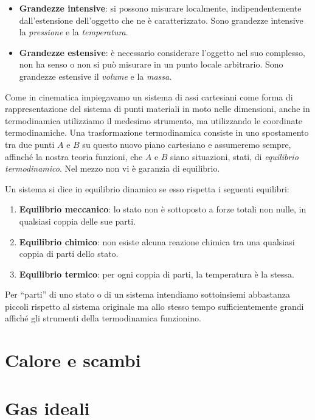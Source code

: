 \begin{itemize}
    \item \textbf{Grandezze intensive}: si possono misurare localmente,
    indipendentemente dall'estensione dell'oggetto che ne è caratterizzato.
    Sono grandezze intensive la \textit{pressione} e la \textit{temperatura}.

    \item \textbf{Grandezze estensive}: è necessario considerare l'oggetto nel
    suo complesso, non ha senso o non si può misurare in un punto locale arbitrario.
    Sono grandezze estensive il \textit{volume} e la \textit{massa}.
\end{itemize}

\noindent Come in cinematica impiegavamo un sistema di assi cartesiani come
forma di rappresentazione del sistema di punti materiali in moto nelle dimensioni,
anche in termodinamica utilizziamo il medesimo strumento, ma utilizzando le
coordinate termodinamiche. Una trasformazione termodinamica consiste in uno
spostamento tra due punti $A$ e $B$ su questo nuovo piano cartesiano e assumeremo
sempre, affinché la nostra teoria funzioni, che $A$ e $B$ siano situazioni, stati, di
\textit{equilibrio termodinamico}. Nel mezzo non vi è garanzia di equilibrio.

Un sistema si dice in equilibrio dinamico se esso rispetta i seguenti equilibri:
\begin{enumerate}
    \item \textbf{Equilibrio meccanico}: lo stato non è sottoposto a forze totali non nulle,
    in qualsiasi coppia delle sue parti.

    \item \textbf{Equilibrio chimico}: non esiste alcuna reazione chimica tra una qualsiasi
    coppia di parti dello stato.

    \item \textbf{Equilibrio termico}: per ogni coppia di parti, la temperatura è la stessa.
\end{enumerate}

\noindent Per ``parti'' di uno stato o di un sistema intendiamo sottoinsiemi
abbastanza piccoli rispetto al sistema originale ma allo stesso tempo sufficientemente
grandi affiché gli strumenti della termodinamica funzionino.

\section{Calore e scambi}
\section{Gas ideali}
